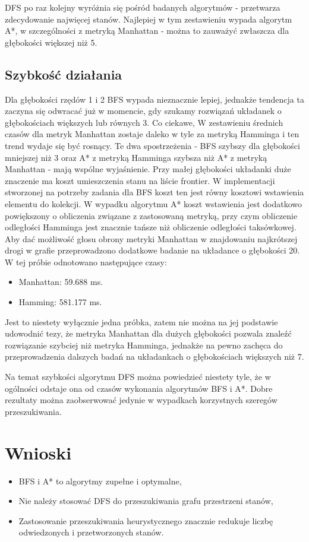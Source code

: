 \documentclass{classrep}
\begin{document}
DFS po raz kolejny wyróżnia się pośród badanych algorytmów - przetwarza zdecydowanie najwięcej stanów.
Najlepiej w tym zestawieniu wypada algorytm A*, w szczególności z metryką Manhattan - można to zauważyć
zwłaszcza dla głębokości większej niż 5.

\subsection{Szybkość działania}

Dla głębokości rzędów 1 i 2 BFS wypada nieznacznie lepiej, jednakże tendencja ta zaczyna się odwracać już w
momencie, gdy szukamy rozwiązań układanek o głębokościach większych lub równych 3. Co ciekawe, W zestawieniu
średnich czasów dla metryk Manhattan zostaje daleko w tyle za metryką Hamminga i ten trend wydaje się być
rosnący. Te dwa spostrzeżenia - BFS szybszy dla głębokości mniejszej niż 3 oraz A* z metryką Hamminga szybsza
niż A* z metryką Manhattan - mają wspólne wyjaśnienie. Przy małej głębokości układanki duże znaczenie ma koszt
umieszczenia stanu na liście frontier. W implementacji stworzonej na potrzeby zadania  dla BFS koszt
ten jest równy kosztowi wstawienia elementu do kolekcji. W wypadku algorytmu A* koszt wstawienia jest
dodatkowo powiększony o obliczenia związane z zastosowaną metryką, przy czym obliczenie odległości Hamminga
jest znacznie tańsze niż obliczenie odległości taksówkowej. Aby dać możliwość głosu obrony metryki Manhattan w
znajdowaniu najkrótszej drogi w grafie przeprowadzono dodatkowe badanie na układance o głębokości 20. W tej
próbie odnotowano następujące czasy:

\begin{itemize}
  \item Manhattan: 59.688 ms.
  \item Hamming: 581.177 ms.
\end{itemize}

Jest to niestety wyłącznie jedna próbka, zatem nie można na jej podstawie udowodnić tezy, że metryka Manhattan
dla dużych głębokości pozwala znaleźć rozwiązanie szybciej niż metryka Hamminga, jednakże na pewno zachęca do
przeprowadzenia dalszych badań na układankach o głębokościach większych niż 7.

Na temat szybkości algorytmu DFS można powiedzieć niestety tyle, że w ogólności odstaje ona od czasów
wykonania algorytmów BFS i A*. Dobre rezultaty można zaobserwować jedynie w wypadkach korzystnych szeregów
przeszukiwania.

\section{Wnioski}
\begin{itemize}
  \item BFS i A* to algorytmy zupełne i optymalne,
  \item Nie należy stosować DFS do przeszukiwania grafu przestrzeni stanów,
  \item Zastosowanie przeszukiwania heurystycznego znacznie redukuje liczbę odwiedzonych i przetworzonych
    stanów.
\end{itemize}
\end{document}
